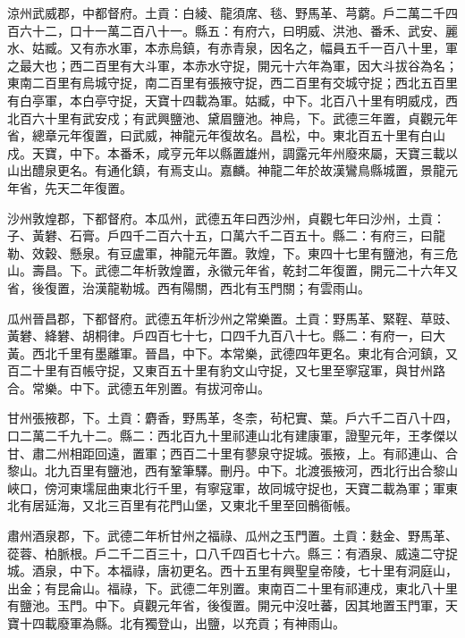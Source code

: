 \begin{pinyinscope}
 涼州武威郡，中都督府。土貢：白綾、龍須席、毯、野馬革、芎藭。戶二萬二千四百六十二，口十一萬二百八十一。縣五：有府六，曰明威、洪池、番禾、武安、麗水、姑臧。又有赤水軍，本赤烏鎮，有赤青泉，因名之，幅員五千一百八十里，軍之最大也；西二百里有大斗軍，本赤水守捉，開元十六年為軍，因大斗拔谷為名；東南二百里有烏城守捉，南二百里有張掖守捉，西二百里有交城守捉；西北五百里有白亭軍，本白亭守捉，天寶十四載為軍。姑臧，中下。北百八十里有明威戍，西北百六十里有武安戍；有武興鹽池、黛眉鹽池。神烏，下。武德三年置，貞觀元年省，總章元年復置，曰武威，神龍元年復故名。昌松，中。東北百五十里有白山戍。天寶，中下。本番禾，咸亨元年以縣置雄州，調露元年州廢來屬，天寶三載以山出醴泉更名。有通化鎮，有焉支山。嘉麟。神龍二年於故漢鸞鳥縣城置，景龍元年省，先天二年復置。



 沙州敦煌郡，下都督府。本瓜州，武德五年曰西沙州，貞觀七年曰沙州，土貢：子、黃礬、石膏。戶四千二百六十五，口萬六千二百五十。縣二：有府三，曰龍勒、效穀、懸泉。有豆盧軍，神龍元年置。敦煌，下。東四十七里有鹽池，有三危山。壽昌。下。武德二年析敦煌置，永徽元年省，乾封二年復置，開元二十六年又省，後復置，治漢龍勒城。西有陽關，西北有玉門關；有雲雨山。



 瓜州晉昌郡，下都督府。武德五年析沙州之常樂置。土貢：野馬革、緊鞓、草豉、黃礬、絳礬、胡桐律。戶四百七十七，口四千九百八十七。縣二：有府一，曰大黃。西北千里有墨離軍。晉昌，中下。本常樂，武德四年更名。東北有合河鎮，又百二十里有百帳守捉，又東百五十里有豹文山守捉，又七里至寧寇軍，與甘州路合。常樂。中下。武德五年別置。有拔河帝山。



 甘州張掖郡，下。土貢：麝香，野馬革，冬柰，茍杞實、葉。戶六千二百八十四，口二萬二千九十二。縣二：西北百九十里祁連山北有建康軍，證聖元年，王孝傑以甘、肅二州相距回遠，置軍；西百二十里有蓼泉守捉城。張掖，上。有祁連山、合黎山。北九百里有鹽池，西有鞏筆驛。刪丹。中下。北渡張掖河，西北行出合黎山峽口，傍河東壖屈曲東北行千里，有寧寇軍，故同城守捉也，天寶二載為軍；軍東北有居延海，又北三百里有花門山堡，又東北千里至回鶻衙帳。



 肅州酒泉郡，下。武德二年析甘州之福祿、瓜州之玉門置。土貢：麩金、野馬革、蓯蓉、柏脈根。戶二千二百三十，口八千四百七十六。縣三：有酒泉、威遠二守捉城。酒泉，中下。本福祿，唐初更名。西十五里有興聖皇帝陵，七十里有洞庭山，出金；有昆侖山。福祿，下。武德二年別置。東南百二十里有祁連戍，東北八十里有鹽池。玉門。中下。貞觀元年省，後復置。開元中沒吐蕃，因其地置玉門軍，天寶十四載廢軍為縣。北有獨登山，出鹽，以充貢；有神雨山。




\end{pinyinscope}
